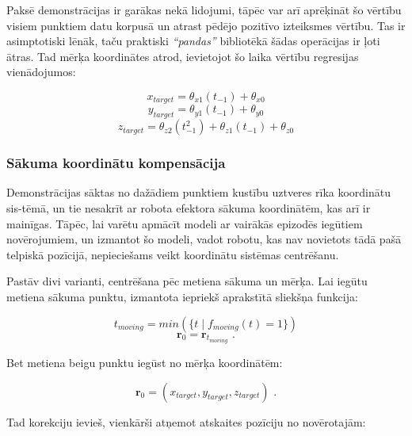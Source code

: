 \documentclass[12pt, a4paper]{article}
\numberwithin{equation}{section} %
\begin{document}
Paksē demonstrācijas ir garākas nekā lidojumi, tāpēc var arī aprēķināt šo vērtību visiem punktiem datu korpusā un atrast pēdējo pozitīvo izteiksmes vērtību. Tas ir asimptotiski lēnāk, taču praktiski \textit{``pandas''} bibliotēkā šādas operācijas ir ļoti ātras. Tad mērķa koordinātes atrod, ievietojot šo laika vērtību regresijas vienādojumos:

\begin{equation}
    x_{target} = \theta_{x1}(t_{-1}) + \theta_{x0}
\end{equation}
\begin{equation}
    y_{target} = \theta_{y1}(t_{-1}) + \theta_{y0}
\end{equation}
\begin{equation}
    z_{target} = \theta_{z2}(t_{-1}^2) + \theta_{z1}(t_{-1}) + \theta_{z0}
\end{equation}

\subsubsection{Sākuma koordinātu kompensācija}

Demonstrācijas sāktas no dažādiem punktiem kustību uztveres rīka koordinātu sis-tēmā, un tie nesakrīt ar robota efektora sākuma koordinātēm, kas arī ir mainīgas. Tāpēc, lai varētu apmācīt modeli ar vairākās epizodēs iegūtiem novērojumiem, un izmantot šo modeli, vadot robotu, kas nav novietots tādā pašā telpiskā pozīcijā, nepieciešams veikt koordinātu sistēmas centrēšanu.

Pastāv divi varianti, centrēšana pēc metiena sākuma un mērķa. Lai iegūtu metiena sākuma punktu, izmantota iepriekš aprakstītā sliekšņa funkcija:

\begin{equation}
    t_{moving} = min(\lbrace t \mid f_{moving}(t) = 1 \rbrace)
\end{equation}
\begin{equation}
     \boldsymbol{r}_{0} =  \boldsymbol{r}_{t_{moving}}
\text{ .}
\end{equation}

Bet metiena beigu punktu iegūst no mērķa koordinātēm:

\begin{equation}
     \boldsymbol{r}_{0} = ( x_{target}, y_{target}, z_{target} )
\text{ .}
\end{equation}

Tad korekciju ievieš, vienkārši atņemot atskaites pozīciju no novērotajām:
\end{document}
